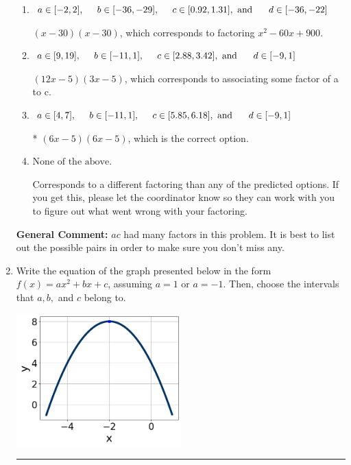\documentclass{extbook}[14pt]
\newcommand{\litem}[1]{\item #1

\rule{\textwidth}{0.4pt}}
\begin{document}
\begin{enumerate}
{\begin{enumerate}[label=\Alph*.]
 $(3x -5)(12x -5)$, which corresponds to associating some factor of c to a.
\item \( a \in [-2, 2], \hspace*{5mm} b \in [-36, -29], \hspace*{5mm} c \in [0.92, 1.31], \text{ and } \hspace*{5mm} d \in [-36, -22] \)

 $(x -30)(x -30)$, which corresponds to factoring $x^{2} -60 x + 900$.
\item \( a \in [9, 19], \hspace*{5mm} b \in [-11, 1], \hspace*{5mm} c \in [2.88, 3.42], \text{ and } \hspace*{5mm} d \in [-9, 1] \)

 $(12x -5)(3x -5)$, which corresponds to associating some factor of a to c.
\item \( a \in [4, 7], \hspace*{5mm} b \in [-11, 1], \hspace*{5mm} c \in [5.85, 6.18], \text{ and } \hspace*{5mm} d \in [-9, 1] \)

* $(6x -5)(6x -5)$, which is the correct option.
\item \( \text{None of the above.} \)

 Corresponds to a different factoring than any of the predicted options. If you get this, please let the coordinator know so they can work with you to figure out what went wrong with your factoring.
\end{enumerate}

\textbf{General Comment:} $ac$ had many factors in this problem. It is best to list out the possible pairs in order to make sure you don't miss any.
}
\litem{
Write the equation of the graph presented below in the form $f(x)=ax^2+bx+c$, assuming  $a=1$ or $a=-1$. Then, choose the intervals that $a, b,$ and $c$ belong to.

\begin{center}
    \includegraphics[width=0.5\textwidth]{../Figures/quadraticGraphToEquationCopyA.png}
\end{center}


}
\end{enumerate}
\end{document}
